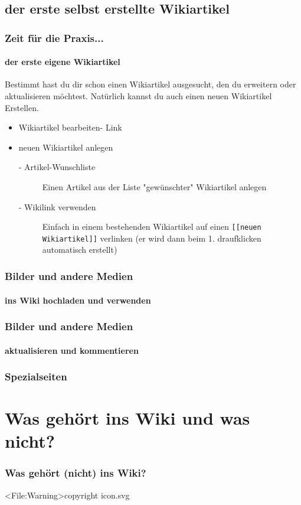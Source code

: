 \documentclass{beamer}              %
\begin{document}
\subsection{der erste selbst erstellte Wikiartikel}

\begin{frame}
  \frametitle{Zeit für die Praxis...}
  \framesubtitle{der erste eigene Wikiartikel}

  Bestimmt hast du dir schon einen Wikiartikel ausgesucht, den du erweitern oder aktualisieren möchtest. Natürlich kannst du auch einen neuen Wikiartikel Erstellen.
  
  \begin{itemize}
    \item Wikiartikel bearbeiten- Link
    \item neuen Wikiartikel anlegen
    \begin{description}
      \item[- Artikel-Wunschliste] Einen Artikel aus der Liste "gewünschter" Wikiartikel anlegen
      \item[- Wikilink verwenden] Einfach in einem bestehenden Wikiartikel auf einen \texttt{[[neuen Wikiartikel]]} verlinken (er wird dann beim 1. draufklicken automatisch erstellt)
    \end{description}
  \end{itemize}

\end{frame}

\begin{frame}
  \frametitle{Bilder und andere Medien}
  \framesubtitle{ins Wiki hochladen und verwenden}

\end{frame}


\begin{frame}
  \frametitle{Bilder und andere Medien}
  \framesubtitle{aktualisieren und kommentieren}

\end{frame}


\begin{frame}
  \frametitle{Spezialseiten}

\end{frame}

\section{Was gehört ins Wiki und was nicht?}

\begin{frame}
  \frametitle{Was gehört (nicht) ins Wiki?}

  \textless File:Warning\textgreater  copyright icon.svg

\end{frame}
\end{document}
